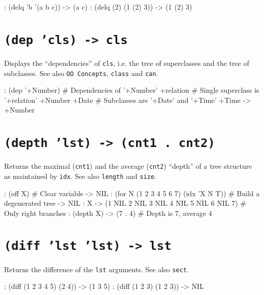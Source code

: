 \begin{wideverbatim}
: (delq 'b '(a b c))
-> (a c)
: (delq (2) (1 (2) 3))
-> (1 (2) 3)
\end{wideverbatim}

 
\section*{\texttt{(dep 'cls) -> cls}}
\label{sec:func-ref-D-(dep 'cls) -> cls}


Displays the ``dependencies'' of \texttt{cls}, i.e. the tree of superclasses and
the tree of subclasses. See also \texttt{OO Concepts}, \texttt{class} and \texttt{can}.


\begin{wideverbatim}
: (dep '+Number)           # Dependencies of '+Number'
   +relation               # Single superclass is '+relation'
+Number
   +Date                   # Subclasses are '+Date' and '+Time'
   +Time
-> +Number
\end{wideverbatim}

 
\section*{\texttt{(depth 'lst) -> (cnt1 . cnt2)}}
\label{sec:func-ref-D-(depth 'lst) -> (cnt1 . cnt2)}


Returns the maximal (\texttt{cnt1}) and the average (\texttt{cnt2}) ``depth'' of a tree
structure as maintained by \texttt{idx}. See also \texttt{length} and \texttt{size}.


\begin{wideverbatim}
: (off X)                                    # Clear variable
-> NIL
: (for N (1 2 3 4 5 6 7) (idx 'X N T))       # Build a degenerated tree
-> NIL
: X
-> (1 NIL 2 NIL 3 NIL 4 NIL 5 NIL 6 NIL 7)   # Only right branches
: (depth X)
-> (7 . 4)                                   # Depth is 7, average 4
\end{wideverbatim}

 
\section*{\texttt{(diff 'lst 'lst) -> lst}}
\label{sec:func-ref-D-(diff 'lst 'lst) -> lst}


Returns the difference of the \texttt{lst} arguments. See also \texttt{sect}.


\begin{wideverbatim}
: (diff (1 2 3 4 5) (2 4))
-> (1 3 5)
: (diff (1 2 3) (1 2 3))
-> NIL
\end{wideverbatim}

